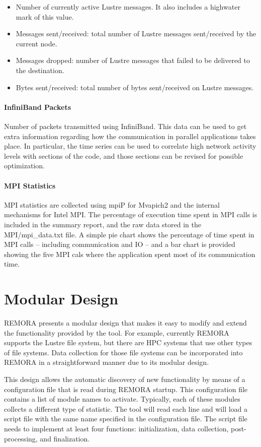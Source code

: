 \documentclass[10pt,a4paper]{report}
\begin{document}
\begin{itemize}
\item Number of currently active Lustre messages. It also includes a highwater mark of this value.
\item Messages sent/received: total number of Lustre messages sent/received by the current node.
\item Messages dropped: number of Lustre messages that failed to be delivered to the destination.
\item Bytes sent/received: total number of bytes sent/received on Lustre messages.
\end{itemize}


\paragraph{InfiniBand Packets}
Number of packets transmitted using InfiniBand. This data can be used to get extra information regarding how the communication in parallel applications takes place. In particular, the time series can be used to correlate high network activity levels with sections of the code, and those sections can be revised for possible optimization.

\paragraph{MPI Statistics}
MPI statistics are collected using mpiP for Mvapich2 and the internal mechanisms for Intel MPI. The percentage of execution time spent in MPI calls is included in the summary report, and the raw data stored in the MPI/mpi\_data.txt file. A simple pie chart shows the percentage of time spent in MPI calls -- including communication and IO -- and a bar chart is provided showing the five MPI cals where the application spent most of its communication time.

\FloatBarrier
\section{Modular Design}
REMORA presents a modular design that makes it easy to modify and extend the functionality 
provided by the tool. For example, currently REMORA supports
the Lustre file system, but there are HPC systems that use other types of file systems.
Data collection for those file systems can be incorporated into REMORA in a straightforward
manner due to its modular design.

This design allows the automatic discovery of new functionality by means of a configuration
file that is read during REMORA startup. This configuration file contains
a list of module names to activate. Typically, each of these modules collects a 
different type of statistic. The tool will read each line and will load a
script file with the same name specified in the configuration file. The script file needs
to implement at least four functions: initialization, data collection, post-processing, and 
finalization.
\end{document}
